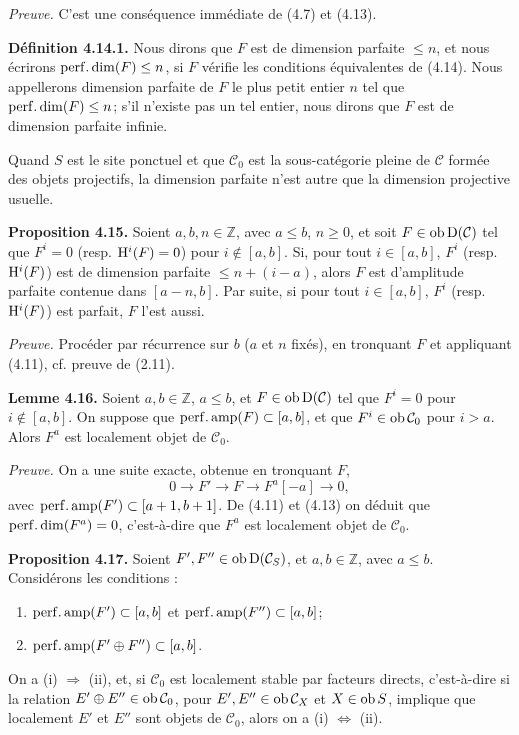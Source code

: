 \documentclass[11pt]{article}
\begin{document}
\emph{Preuve.} C'est une conséquence immédiate de (4.7) et (4.13).

\textbf{Définition 4.14.1.} Nous dirons que \(F\) est de dimension parfaite \(\leq n\), et nous écrirons \(\operatorname{perf.dim}(F)\leq n\), si \(F\) vérifie les conditions équivalentes de (4.14). Nous appellerons dimension parfaite de \(F\) le plus petit entier \(n\) tel que \(\operatorname{perf.dim}(F)\leq n\); s'il n'existe pas un tel entier, nous dirons que \(F\) est de dimension parfaite infinie.

Quand \(S\) est le site ponctuel et que \(\mathcal C_0\) est la sous-catégorie pleine de \(\mathcal C\) formée des objets projectifs, la dimension parfaite n'est autre que la dimension projective usuelle.

\textbf{Proposition 4.15.} Soient \(a,b,n\in\mathbb Z\), avec \(a\leq b\), \(n\geq0\), et soit \(F\in\operatorname{ob}\mathrm D(\mathcal C)\) tel que \(F^i=0\) (resp. \(\mathrm H^i(F)=0\)) pour \(i\notin[a,b]\). Si, pour tout \(i\in[a,b]\), \(F^i\) (resp. \(\mathrm H^i(F)\)) est de dimension parfaite \(\leq n+(i-a)\), alors \(F\) est d'amplitude parfaite contenue dans \([a-n,b]\). Par suite, si pour tout \(i\in[a,b]\), \(F^i\) (resp. \(\mathrm H^i(F)\)) est parfait, \(F\) l'est aussi.

\emph{Preuve.} Procéder par récurrence sur \(b\) (\(a\) et \(n\) fixés), en tronquant \(F\) et appliquant (4.11), cf. preuve de (2.11).

\textbf{Lemme 4.16.} Soient \(a,b\in\mathbb Z\), \(a\leq b\), et \(F\in\operatorname{ob}\mathrm D(\mathcal C)\) tel que \(F^i=0\) pour \(i\notin[a,b]\). On suppose que \(\operatorname{perf.amp}(F)\subset[a,b]\), et que \(F^i\in\operatorname{ob}\mathcal C_0\) pour \(i>a\). Alors \(F^a\) est localement objet de \(\mathcal C_0\).

\emph{Preuve.} On a une suite exacte, obtenue en tronquant \(F\),
\[
  0\longrightarrow F'\longrightarrow F\longrightarrow F^a[-a]\longrightarrow 0,
\]
avec \(\operatorname{perf.amp}(F')\subset[a+1,b+1]\). De (4.11) et (4.13) on déduit que \(\operatorname{perf.dim}(F^a)=0\), c'est-à-dire que \(F^a\) est localement objet de \(\mathcal C_0\).

\textbf{Proposition 4.17.} Soient \(F',F''\in\operatorname{ob}\mathrm D(\mathcal C_S)\), et \(a,b\in\mathbb Z\), avec \(a\leq b\). Considérons les conditions :
\begin{enumerate}[label=(\roman*)]
\item \(\operatorname{perf.amp}(F')\subset[a,b]\) et \(\operatorname{perf.amp}(F'')\subset[a,b]\);
\item \(\operatorname{perf.amp}(F'\oplus F'')\subset[a,b]\).
\end{enumerate}
On a (i) \(\Rightarrow\) (ii), et, si \(\mathcal C_0\) est localement stable par facteurs directs, c'est-à-dire si la relation \(E'\oplus E''\in\operatorname{ob}\mathcal C_0\), pour \(E',E''\in\operatorname{ob}\mathcal C_X\) et \(X\in\operatorname{ob} S\), implique que localement \(E'\) et \(E''\) sont objets de \(\mathcal C_0\), alors on a (i) \(\Leftrightarrow\) (ii).
\end{document}
